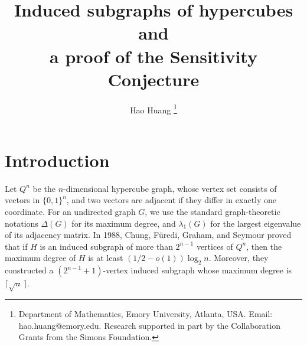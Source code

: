\documentclass[12pt]{article}
\theoremstyle{plain}
\theoremstyle{definition}
\begin{document}
	
	\title{Induced subgraphs of hypercubes and \\a proof of the Sensitivity Conjecture}
	\author{Hao Huang \thanks{Department of Mathematics, Emory University, Atlanta, USA. Email: hao.huang@emory.edu. Research supported in part by the Collaboration Grants from the Simons Foundation.}}
	\date{}
	
		
\maketitle
{}
\section{Introduction}
Let $Q^n$ be the $n$-dimensional hypercube graph, whose vertex set consists of vectors in $\{0, 1\}^n$, and two vectors are adjacent if they differ in exactly one coordinate. For an undirected graph $G$, we use the standard graph-theoretic notations $\Delta(G)$ for its maximum degree, and $\lambda_1(G)$ for the largest eigenvalue of its adjacency matrix. In 1988, Chung, F\"uredi, Graham, and Seymour \cite{cfgs_cube} proved that if $H$ is an induced subgraph of more than $2^{n-1}$ vertices of $Q^n$, then the maximum degree of $H$ is at least $(1/2-o(1)) \log_2 n$. Moreover, they constructed a $(2^{n-1}+1)$-vertex induced subgraph whose maximum degree is $\lceil \sqrt{n}\, \rceil$.
\end{document}
